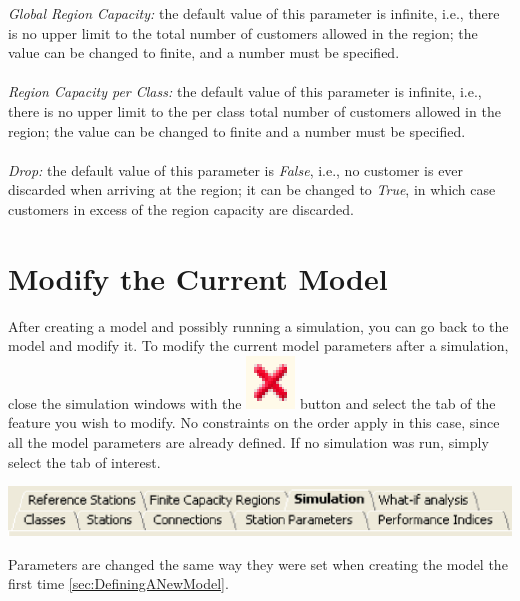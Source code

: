 \begin{description*}
\emph{Global Region Capacity: }
the default value of this parameter is infinite, i.e., there is no upper limit to the total number of customers allowed in the region; the value can be  changed to finite, and a number must be specified.\\\\
\emph{Region Capacity per Class: }
the default value of this parameter is infinite, i.e., there is no upper limit to the per class total number of customers allowed in  the region; the value can be changed to finite and a number must be specified.\\\\
\emph{Drop:}
the default value of this parameter is \emph{False}, i.e., no customer is ever discarded when arriving at the region; it can be changed to \emph{True}, in which case customers in excess of the region capacity are discarded.

\section{Modify the Current Model}
\label{sec:ModifyTheCurrentModel}
After creating a model and possibly running a simulation, you can go back to the model and modify it.
To modify the current model parameters after a simulation, close the simulation windows with the \includegraphics[scale=.5]{img/jsim/exit_simulation.eps} button and select the tab of the feature you wish to modify. No constraints on the order apply in this case, since all the model parameters are already defined. If no simulation was run, simply select the tab of interest.
\begin{center}
\includegraphics[scale=.5]{img/jsim/tabs_list_complete.eps}
\end{center}
Parameters are changed the same way they were set when creating the model the first time \autoref{sec:DefiningANewModel}.


\end{description*}
